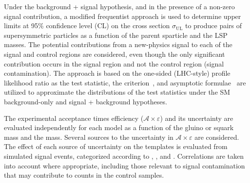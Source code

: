 Under the background + signal hypothesis, and in the presence of a
non-zero signal contribution, a modified frequentist approach is used
to determine upper limits at 95\% confidence level (CL) on the cross
section $\sigma_\text{UL}$ to produce pairs of supersymmetric
particles as a function of the parent sparticle and the LSP
masses. The potential contributions from a new-physics signal to each
of the signal and control regions are considered, even though the only
significant contribution occurs in the signal region and not the
control region (\ie signal contamination). The approach is based on
the one-sided (LHC-style) profile likelihood ratio as the test
statistic, the \cls criterion~\cite{junk, read}, and asymptotic
formulae~\cite{Cowan:2010js} are utilized to approximate the
distributions of the test statistics under the SM background-only and
signal + background hypotheses.

The experimental acceptance times efficiency
($\mathcal{A}\times\varepsilon$) and its uncertainty are evaluated
independently for each model as a function of the gluino or squark
mass and the \chiz mass. Several sources to the uncertainty in
$\mathcal{A}\times\varepsilon$ are considered. The effect of each
source of uncertainty on the \mht templates is evaluated from
simulated signal events, categorized according to \njet, \nb, and
\scalht. Correlations are taken into account where appropriate,
including those relevant to signal contamination that may contribute
to counts in the control samples.

